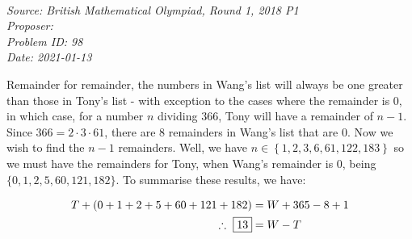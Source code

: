 \SSbreak\\
\emph{Source: British Mathematical Olympiad, Round 1, 2018 P1}\\
\emph{Proposer: \Pss}\\
\emph{Problem ID: 98}\\
\emph{Date: 2021-01-13}\\
\SSbreak

\bigskip

\begin{solution}\hfil\medskip

 Remainder for remainder, the numbers in Wang's list will always be one greater than those in Tony's list - with exception to the cases where the remainder is 0, in which case, for a number \(n\) dividing \(366\), Tony will have a remainder of \(n-1\). Since \(366=2\cdot3\cdot61\), there are 8 remainders in Wang's list that are 0. Now we wish to find the \(n-1\) remainders. Well, we have \(n\in\left\{1,2,3,6,61,122,183\right\}\) so we must have the remainders for Tony, when Wang's remainder is 0, being \(\{0,1,2,5,60,121,182\}\). To summarise these results, we have:

 \begin{align*}
  T+\left(0+1+2+5+60+121+182\right)&=W+365-8+1\\
  \therefore\ \fbox{13}&=W-T
 \end{align*}

\end{solution}\bigskip
